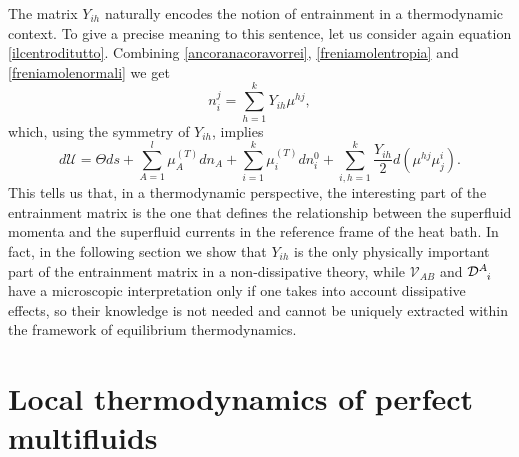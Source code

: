 \documentclass[usenatbib]{mnras}
\begin{document}
%
The matrix $Y_{ih}$ naturally encodes the notion of entrainment in a thermodynamic context. To give a precise meaning to this sentence, let us consider again equation \eqref{ilcentroditutto}. Combining \eqref{ancoranacoravorrei}, \eqref{freniamolentropia} and \eqref{freniamolenormali} we get
%
\begin{equation}
n_i^j = \sum_{h=1}^k Y_{ih} \mu^{hj},
\end{equation}
%
which, using the symmetry of $Y_{ih}$, implies
%
\begin{equation}\label{ilcentroditutto2}
d\mathcal{U} =\Theta ds + \sum_{A=1}^l \mu_A^{(T)} dn_A + \sum_{i=1}^k \mu_i^{(T)} dn_i^0 + \sum_{i,h=1}^k \dfrac{Y_{ih}}{2}  d(\mu^{hj}\mu^i_j).
\end{equation}
%
This tells us that, in a thermodynamic perspective, the interesting part of the entrainment matrix is the one that defines the relationship between the superfluid momenta and the superfluid currents in the reference frame of the heat bath. In fact, in the following section we  show that $Y_{ih}$ is the only physically important part of the entrainment matrix in a non-dissipative theory, while $\mathcal{V}_{AB}$ and $\mathcal{D}\indices{^A _i}$ have a microscopic interpretation only if one takes into account dissipative effects, so their knowledge is not needed and cannot be uniquely extracted within the framework of equilibrium thermodynamics. 

\section{Local thermodynamics of perfect multifluids}
\label{Local thermodynamics of perfect multifluids}
\end{document}
